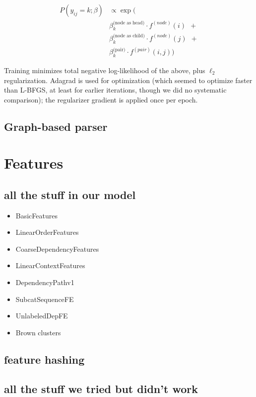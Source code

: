 \documentclass[11pt]{article}
\begin{document}
\begin{align*} 
  P(y_{ij}=k; \beta) & \propto 
  \exp \big( \\
  &
  \beta^{\text{(node as head)}}_k \cdot f^{(node)}(i)
  \ \ + \\ 
  &
  \beta^{\text{(node as child)}}_k \cdot f^{(node)}(j)
  \ \ + \\
  &
  \beta^{\text{(pair)}}_k \cdot f^{(pair)}(i,j)
    \big)
\end{align*}

Training minimizes total negative log-likelihood of the above,
plus $\ell_2$ regularization.  Adagrad is used for optimization (which seemed to optimize faster than L-BFGS, at least for earlier iterations, though we did no systematic comparison); the regularizer gradient is applied once per epoch.


\subsection{Graph-based parser} \label{s:graphparser}


\section{Features}

\subsection{all the stuff in our model}

\begin{itemize}
\item BasicFeatures
\item LinearOrderFeatures
\item CoarseDependencyFeatures
\item LinearContextFeatures
\item DependencyPathv1
\item SubcatSequenceFE
\item UnlabeledDepFE
\item Brown clusters
\end{itemize}
\subsection{feature hashing}

\subsection{all the stuff we tried but didn't work}
\end{document}
